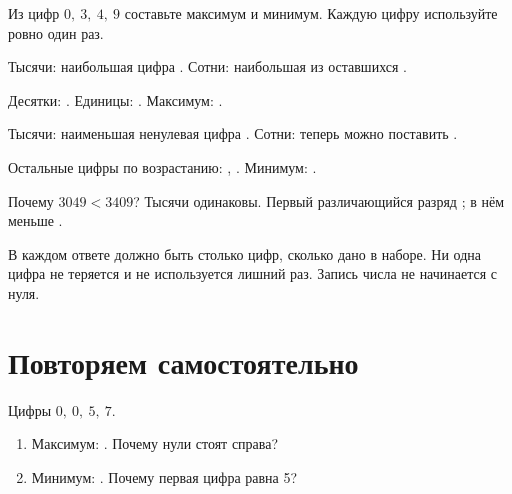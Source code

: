 \studentnameblock

\begin{notebox}[Задача]
  Из цифр \(0,\ 3,\ 4,\ 9\) составьте максимум и минимум. Каждую цифру
  используйте ровно один раз.
\end{notebox}

\begin{practicebox}
  Тысячи: наибольшая цифра \answerblank[14mm].
  Сотни: наибольшая из оставшихся \answerblank[14mm].

  Десятки: \answerblank[14mm]. Единицы: \answerblank[14mm].
  Максимум: \answerblank[40mm].
\end{practicebox}

\begin{practicebox}
  Тысячи: наименьшая ненулевая цифра \answerblank[14mm].
  Сотни: теперь можно поставить \answerblank[14mm].

  Остальные цифры по возрастанию: \answerblank[14mm], \answerblank[14mm].
  Минимум: \answerblank[40mm].
\end{practicebox}

\begin{reflectionbox}
  Почему \(3049<3409\)? Тысячи одинаковы. Первый различающийся разряд \textemdash{}
  \answerblank[23mm]; в нём \answerblank[14mm] меньше \answerblank[14mm].
\end{reflectionbox}

\begin{warningbox}
  В каждом ответе должно быть столько цифр, сколько дано в наборе. Ни одна
  цифра не теряется и не используется лишний раз. Запись числа не начинается
  с нуля.
\end{warningbox}

\newpage
\section{Повторяем самостоятельно}

\begin{practicebox}
  Цифры \(0,\ 0,\ 5,\ 7\).
  \begin{enumerate}[label=\textbf{\arabic*.}]
    \item Максимум: \answerblank[35mm]. Почему нули стоят справа?
    \item Минимум: \answerblank[35mm]. Почему первая цифра равна 5?
  \end{enumerate}
\end{practicebox}

